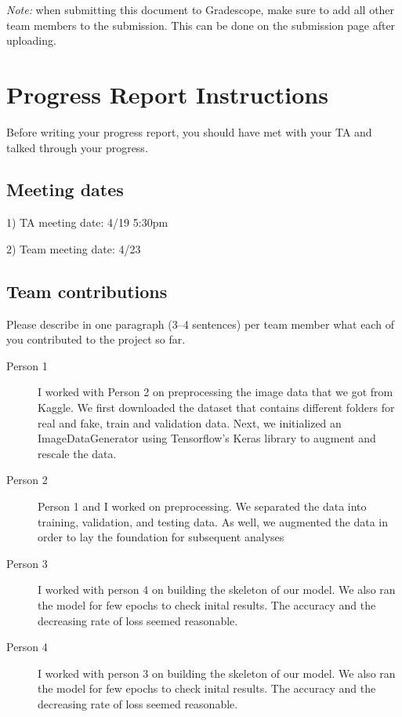 \emph{Note:} when submitting this document to Gradescope, make sure to add all other team members to the submission. This can be done on the submission page after uploading.

\section*{Progress Report Instructions}

Before writing your progress report, you should have met with your TA and talked through your progress.

\subsection*{Meeting dates}

1) TA meeting date: 4/19 5:30pm

2) Team meeting date: 4/23

\subsection*{Team contributions}

Please describe in one paragraph (3--4 sentences) per team member what each of you contributed to the project so far.
\begin{description}
\item[Person 1] I worked with Person 2 on preprocessing the image data that we got from Kaggle. We first downloaded the dataset that contains different folders for real and fake, train and validation data. Next, we initialized an ImageDataGenerator using Tensorflow's Keras library to augment and rescale the data. 
\item[Person 2] Person 1 and I worked on preprocessing. We separated the data into training, validation, and testing data. As well, we augmented the data in order to lay the foundation for subsequent analyses
\item [Person 3] I worked with person 4 on building the skeleton of our model. We also ran the model for few epochs to check inital results. The accuracy and the decreasing rate of loss seemed reasonable.
\item [Person 4] I worked with person 3 on building the skeleton of our model. We also ran the model for few epochs to check inital results. The accuracy and the decreasing rate of loss seemed reasonable.
\end{description}

